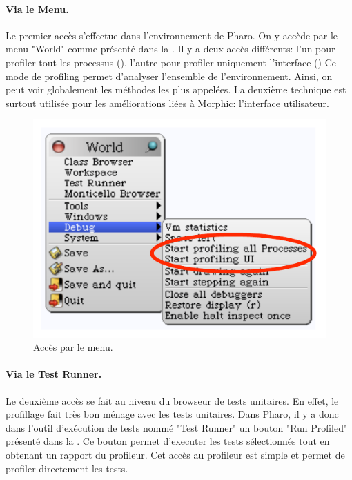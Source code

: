 \documentclass[a4paper,10pt,twoside]{book}
\begin{document}
\paragraph{Via le Menu.}
Le premier acc\`es s'effectue dans l'environnement de Pharo. On y acc\`ede par le menu "World" comme pr\'esent\'e dans la . Il y a deux acc\`es diff\'erents: l'un pour profiler tout les processus (), l'autre pour profiler uniquement l'interface ()
Ce mode de profiling permet d'analyser l'ensemble de l'environnement. Ainsi, on peut voir globalement les m\'ethodes les plus appel\'ees. La deuxi\`eme technique est surtout utilis\'ee pour les am\'eliorations li\'ees \`a Morphic: l'interface utilisateur.


\begin{figure}[h]
	\begin{center}
	\includegraphics[width=.6\linewidth]{menu}
	\caption{Acc\`es par le menu.}
	\end{center}
\end{figure}




\paragraph{Via le Test Runner.}
Le deuxi\`eme acc\`es se fait au niveau du browseur de tests unitaires. En effet, le profillage fait tr\`es bon m\'enage avec les tests unitaires. Dans Pharo, il y a donc dans l'outil d'ex\'ecution de tests nomm\'e "Test Runner" un bouton "Run Profiled" pr\'esent\'e dans la . Ce bouton permet d'executer les tests s\'electionn\'es tout en obtenant un rapport du profileur. Cet acc\`es au profileur est simple et permet de profiler directement les tests.
\end{document}
